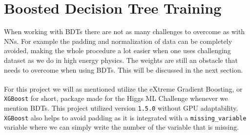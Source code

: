 \documentclass[12pt, a4paper]{book}
\begin{document}
\section{Boosted Decision Tree Training}
When working with BDTs there are not as many challenges to overcome as with NNs. For example the padding and normalization of data can be completely avoided, making the whole procedure a lot easier when one uses challenging dataset as we do in high energy physics.
The weights are still an obstacle that needs to overcome when using BDTs. This will be discussed in the next section.\\
\\For this project we will as mentioned utilize the eXtreme Gradient Boosting, or \verb|XGBoost| for short, package \cite{XGBoost} made for the Higgs ML Challenge \cite{HiggsChallenge} whenever we mention BDTs.
This project utilized version \verb|1.5.0| without GPU adaptability. \verb|XGBoost| also helps to avoid padding as it is integrated with a \verb|missing_variable| variable where we can simply write the number of the variable that is missing.
\end{document}
